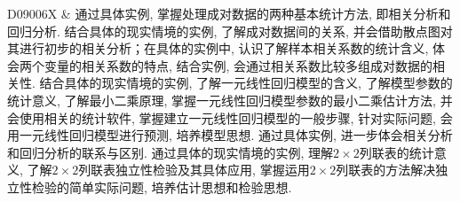 D09006X & 通过具体实例, 掌握处理成对数据的两种基本统计方法, 即相关分析和回归分析. 结合具体的现实情境的实例, 了解成对数据间的关系, 并会借助散点图对其进行初步的相关分析；在具体的实例中, 认识了解样本相关系数的统计含义, 体会两个变量的相关系数的特点, 结合实例, 会通过相关系数比较多组成对数据的相关性. 结合具体的现实情境的实例, 了解一元线性回归模型的含义, 了解模型参数的统计意义, 了解最小二乘原理, 掌握一元线性回归模型参数的最小二乘估计方法, 并会使用相关的统计软件, 掌握建立一元线性回归模型的一般步骤, 针对实际问题, 会用一元线性回归模型进行预测, 培养模型思想. 通过具体实例, 进一步体会相关分析和回归分析的联系与区别. 通过具体的现实情境的实例, 理解$2\times 2$列联表的统计意义, 了解$2\times 2$列联表独立性检验及其具体应用, 掌握运用$2\times 2$列联表的方法解决独立性检验的简单实际问题, 培养估计思想和检验思想.\\ \hline
